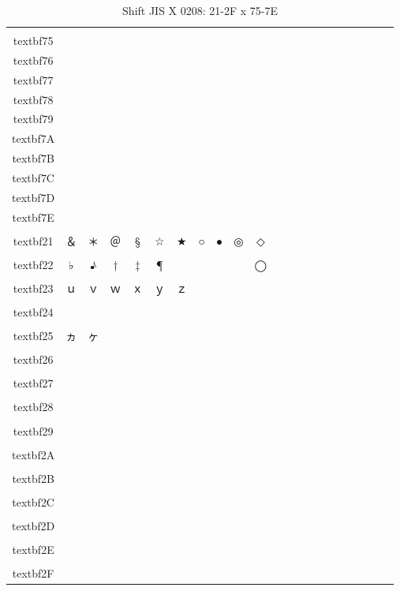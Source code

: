 \begin{table}[H]
\centering
\caption{Shift JIS X 0208: 21-2F x 75-7E}
\begin{tabular}{|Sc|Sc|Sc|Sc|Sc|Sc|Sc|Sc|Sc|Sc|Sc|}
\hline
 & \\textbf{75} & \\textbf{76} & \\textbf{77} & \\textbf{78} & \\textbf{79} & \\textbf{7A} & \\textbf{7B} & \\textbf{7C} & \\textbf{7D} & \\textbf{7E} \\ \hline
\\textbf{21} & ＆ & ＊ & ＠ & § & ☆ & ★ & ○ & ● & ◎ & ◇ \\ \hline
\\textbf{22} & ♭ & ♪ & † & ‡ & ¶ &   &   &   &   & ◯ \\ \hline
\\textbf{23} & ｕ & ｖ & ｗ & ｘ & ｙ & ｚ &   &   &   &   \\ \hline
\\textbf{24} &   &   &   &   &   &   &   &   &   &   \\ \hline
\\textbf{25} & ヵ & ヶ &   &   &   &   &   &   &   &   \\ \hline
\\textbf{26} &  &  &  &  &  &  &  &  &  &  \\ \hline
\\textbf{27} &   &   &   &   &   &   &   &   &   &   \\ \hline
\\textbf{28} &  &  &  &  &  &  &  &  &  &  \\ \hline
\\textbf{29} &  &  &  &  &  &  &  &  &  &  \\ \hline
\\textbf{2A} &  &  &  &  &  &  &  &  &  &  \\ \hline
\\textbf{2B} &  &  &  &  &  &  &  &  &  &  \\ \hline
\\textbf{2C} &  &  &  &  &  &  &  &  &  &  \\ \hline
\\textbf{2D} &  &  &  &  &  &  &  &  &  &  \\ \hline
\\textbf{2E} &  &  &  &  &  &  &  &  &  &  \\ \hline
\\textbf{2F} &  &  &  &  &  &  &  &  &  &  \\ \hline
\end{tabular}
\end{table}

